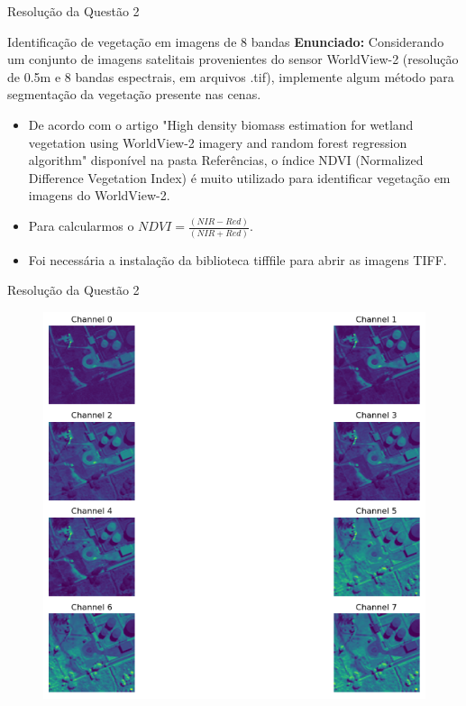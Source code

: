 \documentclass[xcolor=dvipsnames]{beamer}
\begin{document}
	\begin{frame}{Resolução da Questão 2}
		\begin{block}{Identificação de vegetação em imagens de 8 bandas}
			\textbf{Enunciado:} Considerando um conjunto de imagens satelitais provenientes do sensor WorldView-2 (resolução de 0.5m e 8 bandas espectrais, em arquivos .tif), implemente algum método para segmentação da vegetação presente nas cenas.
		\end{block}
		\begin{itemize}
			\item De acordo com o artigo "High density biomass estimation for wetland vegetation using WorldView-2 imagery and random forest regression algorithm" disponível na pasta Referências, o índice NDVI (Normalized Difference Vegetation Index) é muito utilizado para identificar vegetação em imagens do WorldView-2.
			\item Para calcularmos o $NDVI = \frac{(NIR - Red)}{(NIR + Red)}$.
			\item Foi necessária a instalação da biblioteca tifffile para abrir as imagens TIFF.
		\end{itemize}
	\end{frame}

	
	\begin{frame}{Resolução da Questão 2}
		\begin{figure}
			\centering
			\includegraphics[width=0.66\columnwidth]{Figuras/res2-1.png}
		\end{figure}
	\end{frame}
\end{document}
